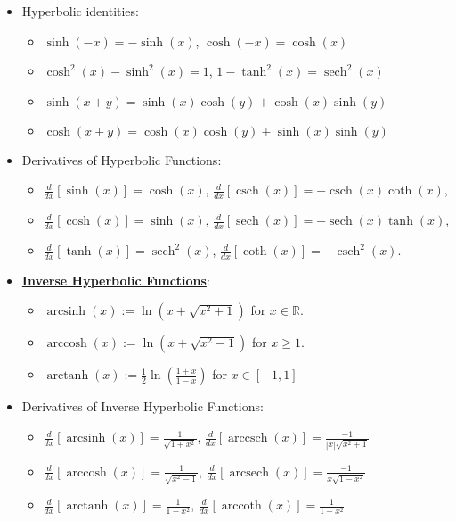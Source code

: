 \documentclass[reqno,11pt]{amsart}
\theoremstyle{definition}
\theoremstyle{remark}
\newcommand{\R}{\mathbb{R}}
\newcommand{\dfn}[1]{\underline{\textbf{#1}}}
\newcommand{\deriv}[1]{\frac{d}{dx} \left[ #1 \right]}
\DeclareMathOperator{\csch}{csch}
\DeclareMathOperator{\sech}{sech}
\DeclareMathOperator{\arcsinh}{arcsinh}
\DeclareMathOperator{\arccosh}{arccosh}
\DeclareMathOperator{\arctanh}{arctanh}
\DeclareMathOperator{\arcsech}{arcsech}
\DeclareMathOperator{\arccsch}{arccsch}
\DeclareMathOperator{\arccoth}{arccoth}
\begin{document}
\begin{itemize}[noitemsep]
\begin{itemize}[noitemsep]
		\item Hyperbolic identities: 
		\begin{itemize}
			\item $\sinh(-x) = - \sinh(x)$, $\cosh(-x) = \cosh(x)$ 
			\item $\cosh^2(x)  - \sinh^2(x) = 1$, $1- \tanh^2(x) = \sech^2(x)$ 
			\item $\sinh(x+y) = \sinh(x) \cosh(y) + \cosh(x) \sinh(y)$
			\item $\cosh(x+y) = \cosh(x) \cosh(y) + \sinh(x) \sinh(y)$
		\end{itemize}
		\item Derivatives of Hyperbolic Functions: 
		\begin{itemize}[noitemsep]
			\item $\deriv{\sinh(x)} = \cosh(x)$, $\deriv{\csch(x)} = - \csch(x) \coth(x)$, 
			\item $\deriv{\cosh(x)} = \sinh(x)$, $\deriv{\sech(x)} = - \sech(x) \tanh(x)$, 
			\item $\deriv{\tanh(x)} = \sech^2(x)$, $\deriv{\coth(x)} = - \csch^2(x)$. 
		\end{itemize}
		\item \dfn{Inverse Hyperbolic Functions}: 
		\begin{itemize}[noitemsep]
			\item $\arcsinh(x) := \ln(x + \sqrt{x^2 + 1})$ for $x \in \R$. 
			\item $\arccosh(x) := \ln ( x + \sqrt{x^2 -1})$ for $x \geq 1$. 
			\item $\arctanh(x) := \frac{1}{2} \ln \left( \frac{1+x}{1-x} \right)$ for $x \in [-1, 1]$ 
		\end{itemize}
		\item Derivatives of Inverse Hyperbolic Functions: 
		\begin{itemize}[noitemsep]
			\item $\deriv{\arcsinh(x)} = \frac{1}{\sqrt{1+x^2}}$, $\deriv{ \arccsch(x)} = \frac{-1}{|x| \sqrt{x^2 +1}}$
			\item $\deriv{\arccosh(x)} = \frac{1}{\sqrt{x^2 - 1}}$, $\deriv{\arcsech(x)} = \frac{-1}{x \sqrt{1-x^2}}$
			\item $\deriv{\arctanh(x)} = \frac{1}{1-x^2}$, $\deriv{ \arccoth(x) } = \frac{1}{1-x^2}$
		\end{itemize}	
	\end{itemize}
\end{itemize}
\end{document}
